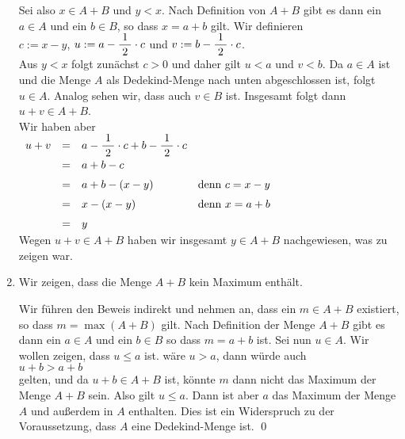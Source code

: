 \begin{enumerate}
      Sei also $x \in A + B$ und $y < x$.  Nach Definition von $A + B$ gibt es dann ein $a \in A$ und ein
      $b \in B$, so dass $x = a + b$ gilt.  Wir definieren
      \\[0.2cm]
      \hspace*{1.3cm} 
      $c := x - y$, \quad $u := a - \displaystyle\frac{\;\displaystyle1\;}{\;\displaystyle2\;} \cdot c$ \quad und \quad
      $v := b - \displaystyle\frac{\;\displaystyle1\;}{\;\displaystyle2\;} \cdot c$.
      \\[0.2cm]
      Aus $y < x $ folgt zunächst $c > 0$ und daher gilt $u < a$ und $v < b$.  Da $a \in A$ ist und die
      Menge $A$ als Dedekind-Menge nach unten abgeschlossen ist, folgt $u \in A$.  Analog sehen wir, dass
      auch $v \in B$ ist.  Insgesamt folgt dann
      \\[0.2cm]
      \hspace*{1.3cm}
      $u + v \in A + B$.
      \\[0.2cm]
      Wir haben aber
      \\[0.2cm]
      \hspace*{1.3cm}
      $
      \begin{array}[t]{lcll}
        u + v & = & a - \displaystyle\frac{\;\displaystyle1\;}{\;\displaystyle2\;} \cdot c + b - \displaystyle\frac{\;\displaystyle1\;}{\;\displaystyle2\;} \cdot c \\[0.2cm]
              & = & a + b - c                                           \\[0.2cm]
              & = & a + b - (x - y)                                     
                  & \mbox{denn $c = x - y$}                             \\[0.2cm]
              & = & x - (x - y)                                     
                  & \mbox{denn $x = a + b$}                             \\[0.2cm]
              & = & y
      \end{array}
      $
      \\[0.2cm]
      Wegen $u + v \in A + B$ haben wir insgesamt $y \in A + B$ nachgewiesen, was zu zeigen war.
\item Wir zeigen, dass die Menge $A + B$ kein Maximum enthält.

      Wir führen den Beweis indirekt und nehmen an, dass ein $m \in A + B$ existiert, so dass
      $m = \max(A + B)$ gilt.  Nach Definition der Menge $A + B$ gibt es dann ein $a \in A$ und ein 
      $b \in B$ so dass $m = a + b$ ist.  Sei nun $u \in A$.  Wir wollen zeigen, dass $u \leq a$
      ist. wäre $u > a$, dann würde auch 
      \\[0.2cm]
      \hspace*{1.3cm}
      $u + b > a + b$
      \\[0.2cm]
      gelten, und da $u + b \in A + B$ ist, könnte $m$ dann nicht das Maximum der Menge $A + B$ sein.
      Also gilt $u \leq a$.  Dann ist aber $a$ das Maximum der Menge $A$ und außerdem in $A$ enthalten.
      Dies ist ein Widerspruch zu der Voraussetzung, dass $A$ eine Dedekind-Menge ist. \qed
\end{enumerate}


